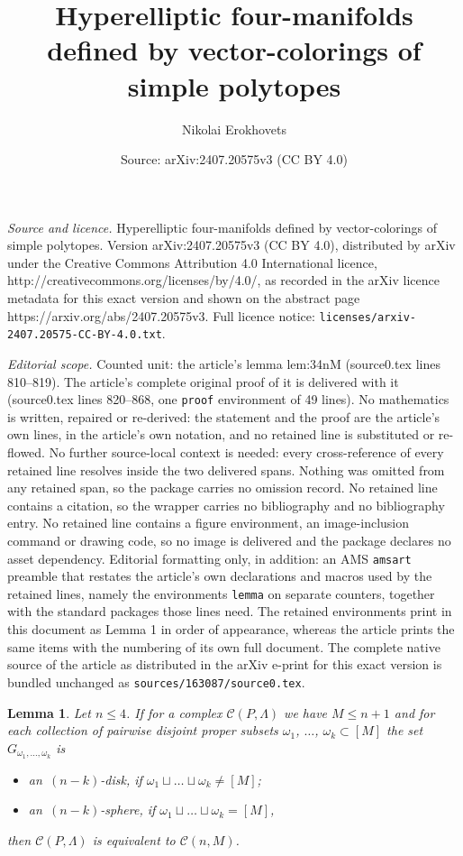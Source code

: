 \documentclass[10pt,a4paper]{amsart}
\title{Hyperelliptic four-manifolds defined by vector-colorings of simple polytopes}
\author{Nikolai Erokhovets}
\date{Source: arXiv:2407.20575v3 (CC BY 4.0)}
\newtheorem{lemma}{Lemma}
\begin{document}
\maketitle

\noindent\emph{Source and licence.} Hyperelliptic four-manifolds defined by vector-colorings of simple polytopes. Version arXiv:2407.20575v3 (CC BY 4.0), distributed by arXiv under the Creative Commons Attribution 4.0 International licence, http://creativecommons.org/licenses/by/4.0/, as recorded in the arXiv licence metadata for this exact version and shown on the abstract page https://arxiv.org/abs/2407.20575v3. Full licence notice: \texttt{licenses/arxiv-2407.20575-CC-BY-4.0.txt}.\par\smallskip

\noindent\textit{Editorial scope.} Counted unit: the article's lemma lem:34nM (source0.tex lines 810--819). The article's complete original proof of it is delivered with it (source0.tex lines 820--868, one \texttt{proof} environment of 49 lines). No mathematics is written, repaired or re-derived: the statement and the proof are the article's own lines, in the article's own notation, and no retained line is substituted or re-flowed.  No further source-local context is needed: every cross-reference of every retained line resolves inside the two delivered spans.  Nothing was omitted from any retained span, so the package carries no omission record.  No retained line contains a citation, so the wrapper carries no bibliography and no bibliography entry.  No retained line contains a figure environment, an image-inclusion command or drawing code, so no image is delivered and the package declares no asset dependency.  Editorial formatting only, in addition: an AMS \texttt{amsart} preamble that restates the article's own declarations and macros used by the retained lines, namely the environments \texttt{lemma} on separate counters, together with the standard packages those lines need.  The retained environments print in this document as Lemma 1 in order of appearance, whereas the article prints the same items with the numbering of its own full document.  The complete native source of the article as distributed in the arXiv e-print for this exact version is bundled unchanged as \texttt{sources/163087/source0.tex}.
\begin{lemma}\label{lem:34nM}
Let $n\leqslant 4$. If for a complex $\mathcal{C}(P,\Lambda)$ we have $M\leqslant n+1$
and for each collection of pairwise disjoint proper subsets $\omega_1$, $\dots$, $\omega_k\subset[M]$ 
the set $G_{\omega_1,\dots,\omega_k}$ is 
\begin{itemize}
\item an~$(n-k)$-disk, if $\omega_1\sqcup\dots\sqcup\omega_k\ne[M]$;
\item an~$(n-k)$-sphere, if $\omega_1\sqcup\dots\sqcup\omega_k=[M]$,
\end{itemize}
then $\mathcal{C}(P,\Lambda)$ is equivalent to $\mathcal{C}(n,M)$.
\end{lemma}
\end{document}
